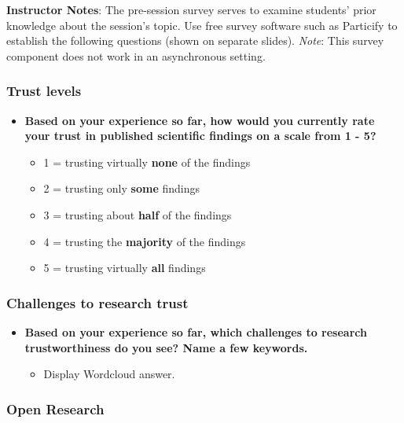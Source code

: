 \documentclass[
  english,
  letterpaper,
  DIV=11,
  numbers=noendperiod]{scrartcl}
\newcounter{none} %
\providecommand{\tightlist}{%
  \setlength{\itemsep}{0pt}\setlength{\parskip}{0pt}}
\begin{document}
\textbf{Instructor Notes}: The pre-session survey serves to examine
students' prior knowledge about the session's topic. Use free survey
software such as Particify to establish the following questions (shown
on separate slides). \emph{Note}: This survey component does not work in
an asynchronous setting.

\subsubsection{Trust levels}

\begin{itemize}
\item
  \textbf{Based on your experience so far, how would you currently rate
  your trust in published scientific findings on a scale from 1 - 5?}

  \begin{itemize}
  \tightlist
  \item
    1 = trusting virtually \textbf{none} of the findings
  \item
    2 = trusting only \textbf{some} findings
  \item
    3 = trusting about \textbf{half} of the findings
  \item
    4 = trusting the \textbf{majority} of the findings
  \item
    5 = trusting virtually \textbf{all} findings
  \end{itemize}
\end{itemize}

\subsubsection{Challenges to research trust}

\begin{itemize}
\item
  \textbf{Based on your experience so far, which challenges to research
  trustworthiness do you see? Name a few keywords.}

  \begin{itemize}
  \tightlist
  \item
    Display Wordcloud answer.
  \end{itemize}
\end{itemize}

\subsubsection{Open Research}
\end{document}
